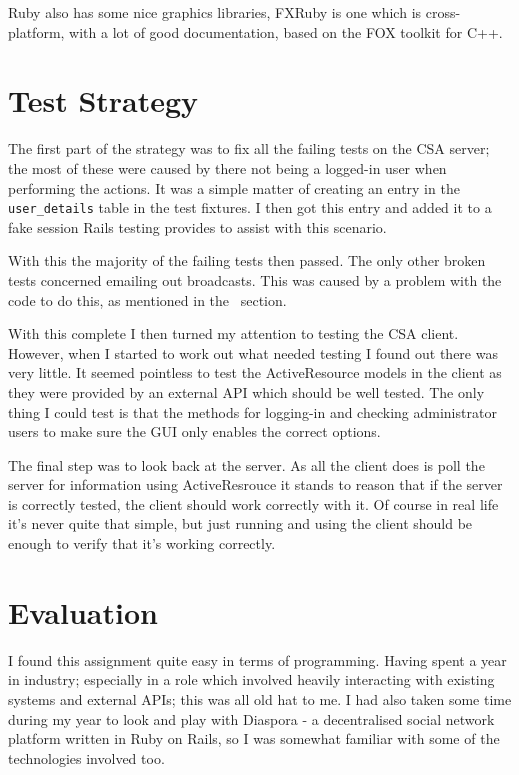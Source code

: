 \documentclass{article}
\begin{document}
Ruby also has some nice graphics libraries, FXRuby is one which is cross-platform, with a
lot of good documentation, based on the FOX toolkit for C++.

\clearpage
\section{Test Strategy}
The first part of the strategy was to fix all the failing tests on the CSA server; the 
most of these were caused by there not being a logged-in user when performing the 
actions. It was a simple matter of creating an entry in the \verb$user_details$ table in
the test fixtures. I then got this entry and added it to a fake session Rails testing
provides to assist with this scenario.\cite{buren07}

With this the majority of the failing tests then passed. The only other broken tests
concerned emailing out broadcasts. This was caused by a problem with the code to do this,
as mentioned in the ~section.

With this complete I then turned my attention to testing the CSA client. However, when
I started to work out what needed testing I found out there was very little. It seemed
pointless to test the ActiveResource models in the client as they were provided by an
external API which should be well tested. The only thing I could test is that the methods
for logging-in and checking administrator users to make sure the GUI only enables the
correct options.

The final step was to look back at the server. As all the client does is poll the server
for information using ActiveResrouce it stands to reason that if the server is correctly
tested, the client should work correctly with it. Of course in real life it's never quite
that simple, but just running and using the client should be enough to verify that it's
working correctly.

\clearpage
\section{Evaluation}
I found this assignment quite easy in terms of programming. Having spent a year in 
industry; especially in a role which involved heavily interacting with existing systems
and external APIs; this was all old hat to me. I had also taken some time during my year
to look and play with Diaspora - a decentralised social network platform written in Ruby
on Rails, so I was somewhat familiar with some of the technologies involved too.
\end{document}
